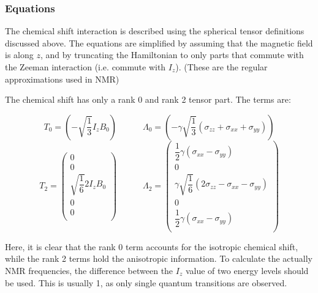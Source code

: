 \documentclass[11pt,a4paper]{article}
\begin{document}
\subsubsection*{Equations}
The chemical shift interaction is described using the spherical tensor definitions discussed
above. The equations are simplified by assuming that the magnetic field is along $z$, and by
truncating the Hamiltonian to only parts that commute with the Zeeman interaction (i.e. commute
with $I_z$). (These are the regular approximations used in NMR)

The chemical shift has only a rank 0 and rank 2 tensor part. The terms are:

\begin{equation}
  T_{0} = \left( - \sqrt{\frac{1}{3}} I_z B_0 \right)
  \quad\quad\quad
\Lambda_0 = \left( - \gamma \sqrt{\frac{1}{3}} (\sigma_{zz} + \sigma_{xx} + \sigma_{yy}) \right)
\end{equation}
\begin{equation}
  T_{2} = \left( \begin{array}{c}
0 \\
0 \\
\sqrt{\dfrac{1}{6}} 2I_z B_0 \\
0 \\
0\\
  \end{array} \right)
  \quad\quad\quad
\Lambda_2 = \left( \begin{array}{c}
  \dfrac{1}{2} \gamma (\sigma_{xx} - \sigma_{yy})\\
  0\\
  \gamma \sqrt{\dfrac{1}{6}} (2\sigma_{zz} - \sigma_{xx} - \sigma_{yy})\\
  0\\
  \dfrac{1}{2} \gamma (\sigma_{xx} - \sigma_{yy})\\
  \end{array} \right)
\end{equation}

Here, it is clear that the rank 0 term accounts for the isotropic chemical shift, while the rank 2
terms hold the anisotropic information. To calculate the actually NMR frequencies, the difference
between the $I_z$ value of two energy levels should be used. This is usually 1, as only single
quantum transitions are observed.
\end{document}
